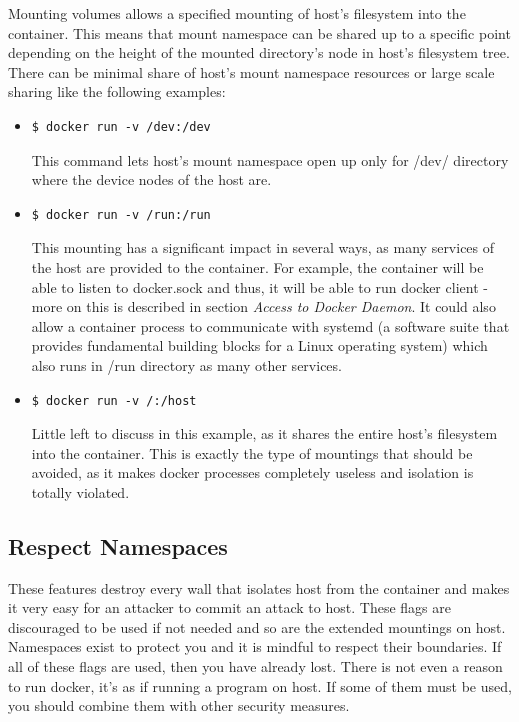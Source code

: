 Mounting volumes allows a specified mounting of host's filesystem into the container. This means that mount namespace can be shared up to a specific point depending on the height of the mounted directory's node in host's filesystem tree.
There can be minimal share of host's mount namespace resources or large scale sharing like the following examples:

\begin{itemize}
\item \begin{lstlisting}[style=dockercommands]
$ docker run -v /dev:/dev
\end{lstlisting}
This command lets host's mount namespace open up only for /dev/ directory where the device nodes of the host are.

\item \begin{lstlisting}[style=dockercommands]
$ docker run -v /run:/run
\end{lstlisting}
This mounting has a significant impact in several ways, as many services of the host are provided to the container. For example, the container will be able to listen to docker.sock and thus, it will be able to run docker client - more on this is described in section \textit{Access to Docker Daemon}. It could also allow a container process to communicate with systemd (a software suite that provides fundamental building blocks for a Linux operating system) which also runs in /run directory as many other services.

\item \begin{lstlisting}[style=dockercommands]
$ docker run -v /:/host
\end{lstlisting}
Little left to discuss in this example, as it shares the entire host's filesystem into the container. This is exactly the type of mountings that should be avoided, as it makes docker processes completely useless and isolation is totally violated.
\end{itemize}

\subsection{Respect Namespaces}
These features destroy every wall that isolates host from the container and makes it very easy for an attacker to commit an attack to host. These flags are discouraged to be used if not needed and so are the extended mountings on host. Namespaces exist to protect you and it is mindful to respect their boundaries. If all of these flags are used, then you have already lost. There is not even a reason to run docker, it's as if running a program on host. If some of them must be used, you should combine them with other security measures. 

